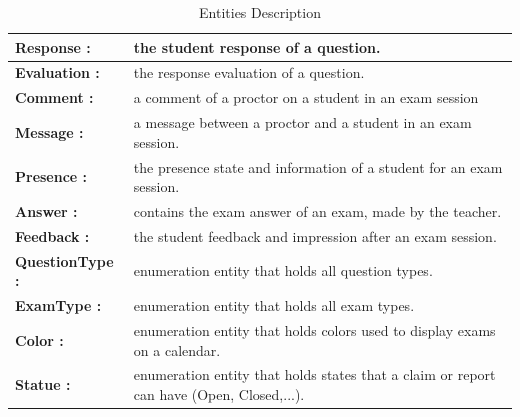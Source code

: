 \documentclass[]{uc2pfecaneva}
\begin{document}
    \clearpage

    \begin{table}[t]
        \begin{tabularx}{\textwidth}{|l|X|}
            \hline
            \textbf{Response :} & the student response of a question.\\ \hline
            \textbf{Evaluation :} & the response evaluation of a question.\\ \hline
            \textbf{Comment :} & a comment of a proctor on a student in an exam session\\ \hline
            \textbf{Message :} & a message between a proctor and a student in an exam session.\\ \hline
            \textbf{Presence :} & the presence state and information of a student for an exam session.\\ \hline
            \textbf{Answer :} & contains the exam answer of an exam, made by the teacher.\\ \hline
            \textbf{Feedback :} & the student feedback and impression after an exam session.\\ \hline
            \textbf{QuestionType :} & enumeration entity that holds all question types.\\ \hline
            \textbf{ExamType :} & enumeration entity that holds all exam types.\\ \hline
            \textbf{Color :} & enumeration entity that holds colors used to display exams on a calendar.\\ \hline
            \textbf{Statue :} & enumeration entity that holds states that a claim or report can have (Open, Closed,...).\\ \hline
        \end{tabularx}
        \caption{Entities Description}
        \label{table:1}
    \end{table}
\end{document}
